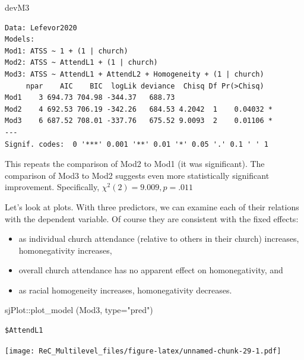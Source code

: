 \documentclass[
  11pt,
]{book}
\newenvironment{Shaded}{\begin{snugshade}}{\end{snugshade}}
\newcommand{\AttributeTok}[1]{\textcolor[rgb]{0.77,0.63,0.00}{#1}}
\newcommand{\FunctionTok}[1]{\textcolor[rgb]{0.00,0.00,0.00}{#1}}
\newcommand{\NormalTok}[1]{#1}
\newcommand{\SpecialCharTok}[1]{\textcolor[rgb]{0.00,0.00,0.00}{#1}}
\newcommand{\StringTok}[1]{\textcolor[rgb]{0.31,0.60,0.02}{#1}}
\providecommand{\tightlist}{%
  \setlength{\itemsep}{0pt}\setlength{\parskip}{0pt}}
\begin{document}
\begin{Shaded}
\begin{Highlighting}[]
\NormalTok{devM3}
\end{Highlighting}
\end{Shaded}

\begin{verbatim}
Data: Lefevor2020
Models:
Mod1: ATSS ~ 1 + (1 | church)
Mod2: ATSS ~ AttendL1 + (1 | church)
Mod3: ATSS ~ AttendL1 + AttendL2 + Homogeneity + (1 | church)
     npar    AIC    BIC  logLik deviance  Chisq Df Pr(>Chisq)  
Mod1    3 694.73 704.98 -344.37   688.73                       
Mod2    4 692.53 706.19 -342.26   684.53 4.2042  1    0.04032 *
Mod3    6 687.52 708.01 -337.76   675.52 9.0093  2    0.01106 *
---
Signif. codes:  0 '***' 0.001 '**' 0.01 '*' 0.05 '.' 0.1 ' ' 1
\end{verbatim}

This repeats the comparison of Mod2 to Mod1 (it was significant). The comparison of Mod3 to Mod2 suggests even more statistically significant improvement. Specifically, \(\chi ^{2}(2) = 9.009, p = .011\)

Let's look at plots. With three predictors, we can examine each of their relations with the dependent variable. Of course they are consistent with the fixed effects:

\begin{itemize}
\tightlist
\item
  as individual church attendance (relative to others in their church) increases, homonegativity increases,
\item
  overall church attendance has no apparent effect on homonegativity, and
\item
  as racial homogeneity increases, homonegativity decreases.
\end{itemize}

\begin{Shaded}
\begin{Highlighting}[]
\NormalTok{sjPlot}\SpecialCharTok{::}\FunctionTok{plot\_model}\NormalTok{ (Mod3, }\AttributeTok{type=}\StringTok{"pred"}\NormalTok{)}
\end{Highlighting}
\end{Shaded}

\begin{verbatim}
$AttendL1
\end{verbatim}

\texttt{[image: ReC\_Multilevel\_files/figure-latex/unnamed-chunk-29-1.pdf]}
\end{document}
